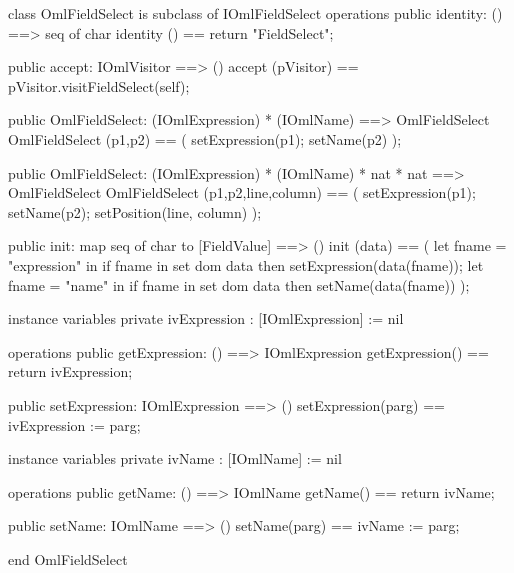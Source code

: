 \begin{vdm_al}
class OmlFieldSelect is subclass of IOmlFieldSelect
operations
  public identity: () ==> seq of char
  identity () == return "FieldSelect";

  public accept: IOmlVisitor ==> ()
  accept (pVisitor) == pVisitor.visitFieldSelect(self);

  public OmlFieldSelect:
    (IOmlExpression) *
    (IOmlName) ==> OmlFieldSelect
  OmlFieldSelect (p1,p2) == 
    ( setExpression(p1);
      setName(p2) );

  public OmlFieldSelect:
    (IOmlExpression) *
    (IOmlName) *
    nat *
    nat ==> OmlFieldSelect
  OmlFieldSelect (p1,p2,line,column) == 
    ( setExpression(p1);
      setName(p2);
      setPosition(line, column) );

  public init: map seq of char to [FieldValue] ==> ()
  init (data) ==
    ( let fname = "expression" in
        if fname in set dom data
        then setExpression(data(fname));
      let fname = "name" in
        if fname in set dom data
        then setName(data(fname)) );

instance variables
  private ivExpression : [IOmlExpression] := nil

operations
  public getExpression: () ==> IOmlExpression
  getExpression() == return ivExpression;

  public setExpression: IOmlExpression ==> ()
  setExpression(parg) == ivExpression := parg;

instance variables
  private ivName : [IOmlName] := nil

operations
  public getName: () ==> IOmlName
  getName() == return ivName;

  public setName: IOmlName ==> ()
  setName(parg) == ivName := parg;

end OmlFieldSelect
\end{vdm_al}

